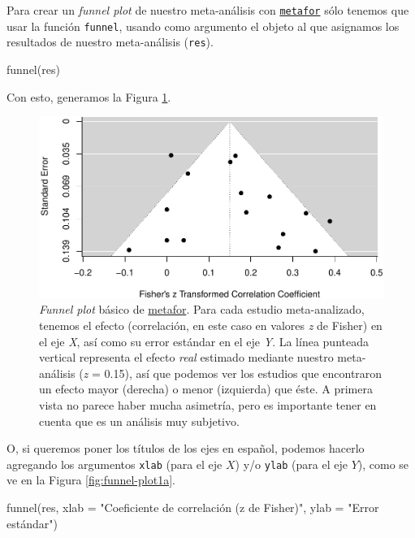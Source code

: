 \documentclass[
  bookmarksnumbered]{article}
\newenvironment{Shaded}{\begin{snugshade}}{\end{snugshade}}
\newcommand{\AttributeTok}[1]{\textcolor[rgb]{0.00,0.34,0.68}{#1}}
\newcommand{\FunctionTok}[1]{\textcolor[rgb]{0.39,0.29,0.61}{#1}}
\newcommand{\NormalTok}[1]{\textcolor[rgb]{0.12,0.11,0.11}{#1}}
\newcommand{\StringTok}[1]{\textcolor[rgb]{0.75,0.01,0.01}{#1}}
\begin{document}
Para crear un \emph{funnel plot} de nuestro meta-análisis con \href{https://www.metafor-project.org/doku.php}{\texttt{metafor}} sólo tenemos que usar la función \texttt{funnel}, usando como argumento el objeto al que asignamos los resultados de nuestro meta-análisis (\texttt{res}).

\begin{Shaded}
\begin{Highlighting}[]
\FunctionTok{funnel}\NormalTok{(res)}
\end{Highlighting}
\end{Shaded}

Con esto, generamos la Figura \ref{fig:funnel-plot1}.

\begin{figure}
\centering
\includegraphics{Meta-analysis_files/figure-latex/funnel-plot1-1.pdf}
\caption{\label{fig:funnel-plot1}\emph{Funnel plot} básico de \href{https://www.metafor-project.org/doku.php}{metafor}. Para cada estudio meta-analizado, tenemos el efecto (correlación, en este caso en valores \emph{z} de Fisher) en el eje \emph{X}, así como su error estándar en el eje \emph{Y}. La línea punteada vertical representa el efecto \emph{real} estimado mediante nuestro meta-análisis (\emph{z} = 0.15), así que podemos ver los estudios que encontraron un efecto mayor (derecha) o menor (izquierda) que éste. A primera vista no parece haber mucha asimetría, pero es importante tener en cuenta que es un análisis muy subjetivo.}
\end{figure}

O, si queremos poner los títulos de los ejes en español, podemos hacerlo agregando los argumentos \texttt{xlab} (para el eje \(X\)) y/o \texttt{ylab} (para el eje \(Y\)), como se ve en la Figura \ref{fig:funnel-plot1a}.

\begin{Shaded}
\begin{Highlighting}[]
\FunctionTok{funnel}\NormalTok{(res, }
       \AttributeTok{xlab =} \StringTok{"Coeficiente de correlación (z de Fisher)"}\NormalTok{,}
       \AttributeTok{ylab =} \StringTok{"Error estándar"}\NormalTok{)}
\end{Highlighting}
\end{Shaded}
\end{document}
